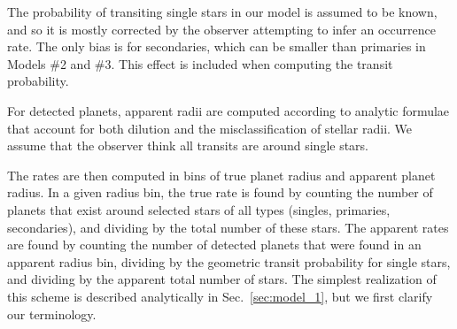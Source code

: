The probability of transiting single stars in our model is assumed to be known,
and so it is mostly corrected by the observer attempting to infer an
occurrence rate. The only bias is for secondaries, which can be smaller than 
primaries in Models \#2 and \#3.
This effect is included when computing the transit probability.

For detected planets, apparent radii are computed according to analytic
formulae that account for both dilution and the misclassification of stellar
radii. We assume that the observer think all transits are around single 
stars.

The rates are then computed in bins of true planet radius and apparent planet
radius.
In a given radius bin, the true rate is found by counting the number of planets
that exist around selected stars of all types (singles, primaries,
secondaries), and dividing by the total number of these stars.
The apparent rates are found by counting the number of detected planets that
were found in an apparent radius bin, dividing by the geometric transit
probability for single stars, and dividing by the apparent total number of
stars.
The simplest realization of this scheme is described analytically in 
Sec.~\ref{sec:model_1}, but we first clarify our terminology.
